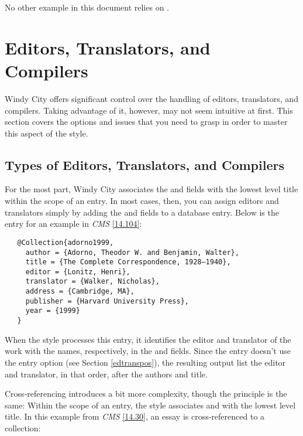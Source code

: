 \documentclass[11pt,letterpaper,oneside]{article}
\begin{document}
\noindent No other example in this document relies on .

\section{Editors, Translators, and Compilers}
\label{edtrans}

Windy City offers significant control over the handling of editors,
translators, and compilers. Taking advantage of it, however, may not
seem intuitive at first. This section covers the options and issues
that you need to grasp in order to master this aspect of the style.

\subsection{Types of Editors, Translators, and Compilers}
\label{edtransnames}

For the most part, Windy City associates the  and
 fields with the lowest level title within the
scope of an entry. In most cases, then, you can assign editors and
translators simply by adding the  and
 fields to a database entry. Below is the entry
for an example in \textit{CMS} \ref{14.104}:

\begin{verbatim}
   @Collection{adorno1999,
     author = {Adorno, Theodor W. and Benjamin, Walter},
     title = {The Complete Correspondence, 1928–1940},
     editor = {Lonitz, Henri},
     translator = {Walker, Nicholas},
     address = {Cambridge, MA},
     publisher = {Harvard University Press},
     year = {1999}
   }
\end{verbatim}

\begin{citebib}
\item \cite{adorno1999}
\end{citebib}

\noindent When the style processes this entry, it identifies the
editor and translator of the work with the names, respectively, in the
 and  fields. Since the entry
doesn't use the  entry option (see Section
\ref{edtranspos}), the resulting output list the editor and
translator, in that order, after the authors and title.

Cross-referencing introduces a bit more complexity, though the
principle is the same: Within the scope of an entry, the style
associates  and  with the lowest
level title. In this example from \textit{CMS} \ref{14.30}, an essay
is cross-referenced to a collection:
\end{document}
